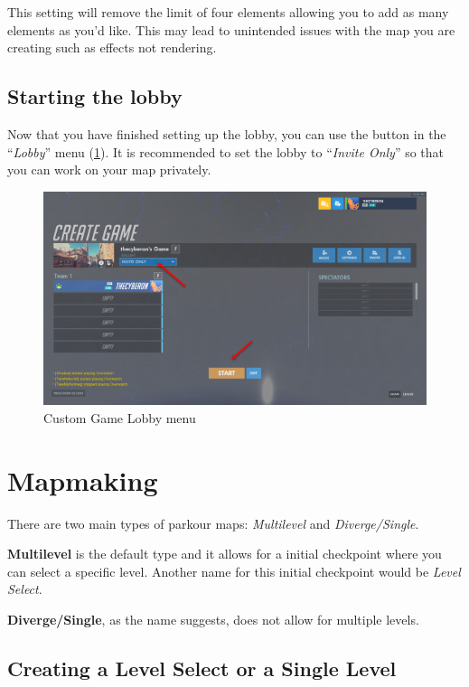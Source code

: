 \documentclass[12pt,a4paper]{article}
\begin{document}
        This setting will remove the limit of four elements allowing you to add as many elements as you'd like. This may lead to unintended issues with the map you are creating such as effects not rendering.
    
    \subsection{Starting the lobby}
        Now that you have finished setting up the lobby, you can use the  button in the ``\textit{Lobby}'' menu (\cref{fig:Picture3}). It is recommended to set the lobby to ``\textit{Invite Only}'' so that you can work on your map privately.
        \begin{figure}[ht]
            \centering
            \includegraphics[width=\textwidth,height=\textheight,keepaspectratio]{Picture3.png}
            \caption{Custom Game Lobby menu}
            \label{fig:Picture3}
        \end{figure}
\newpage
\section{Mapmaking}
    There are two main types of parkour maps: \emph{Multilevel} and \emph{Diverge/Single}.
    
    \textbf{Multilevel} is the default type and it allows for a initial checkpoint where you can select a specific level.  Another name for this initial checkpoint would be \emph{Level Select}.
        
    \textbf{Diverge/Single}, as the name suggests, does not allow for multiple levels.
    
    \subsection{Creating a Level Select or a Single Level}
        
\end{document}
